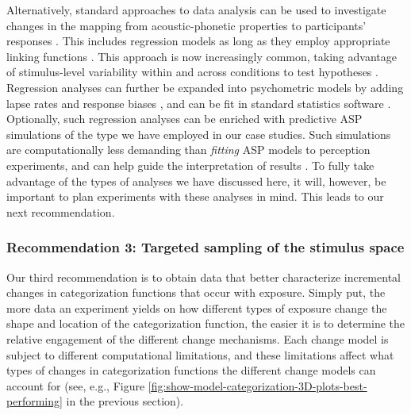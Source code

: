 \documentclass[
  11pt,
  man,floatsintext]{apa6}
\begin{document}
Alternatively, standard approaches to data analysis can be used to investigate changes in the mapping from acoustic-phonetic properties to participants' responses \autocite[for an excellent review, see][]{schertz-clare2020}. This includes regression models as long as they employ appropriate linking functions \autocites[e.g., logistic or multinomial regression for categorization,][]{jaeger2008,winter-wieling2016}. This approach is now increasingly common, taking advantage of stimulus-level variability within and across conditions to test hypotheses \autocites[e.g.,][]{clayards2018,idemaru-holt2020,schertz2015}. Regression analyses can further be expanded into psychometric models \autocite{wichmann-hill2001} by adding lapse rates and response biases \autocites[e.g.,][]{clayards2008,kleinschmidt2020}, and can be fit in standard statistics software \autocite[e.g., \texttt{brms},][]{burkner2017}. Optionally, such regression analyses can be enriched with predictive ASP simulations of the type we have employed in our case studies. Such simulations are computationally less demanding than \emph{fitting} ASP models to perception experiments, and can help guide the interpretation of results \autocites[for examples of approaches that mix predictive simulation with standard data analysis, see][]{bejjanki2011,clayards2008,hitczenko-feldman2016,tan2021,theodore-monto2019,xie2021cognition}[see also discussion in][]{bent-baeseberk2021}. To fully take advantage of the types of analyses we have discussed here, it will, however, be important to plan experiments with these analyses in mind. This leads to our next recommendation.

\hypertarget{recommendation-3-targeted-sampling-of-the-stimulus-space}{%
\subsubsection{Recommendation 3: Targeted sampling of the stimulus space}\label{recommendation-3-targeted-sampling-of-the-stimulus-space}}

Our third recommendation is to obtain data that better characterize incremental changes in categorization functions that occur with exposure. Simply put, the more data an experiment yields on how different types of exposure change the shape and location of the categorization function, the easier it is to determine the relative engagement of the different change mechanisms. Each change model is subject to different computational limitations, and these limitations affect what types of changes in categorization functions the different change models can account for (see, e.g., Figure \ref{fig:show-model-categorization-3D-plots-best-performing} in the previous section).
\end{document}
